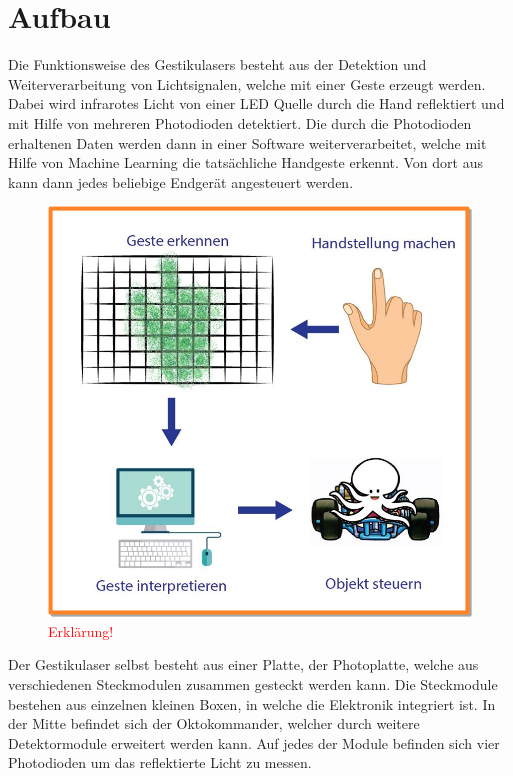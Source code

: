 \chapter{Aufbau}
\label{ch:Funktionsweise und Aufbau}
Die Funktionsweise des Gestikulasers besteht aus der Detektion und Weiterverarbeitung von Lichtsignalen, welche mit einer Geste erzeugt werden. Dabei wird infrarotes Licht von einer LED Quelle durch die Hand reflektiert und mit Hilfe von mehreren Photodioden detektiert. Die durch die Photodioden erhaltenen Daten werden dann in einer Software weiterverarbeitet, welche mit Hilfe von Machine Learning die tatsächliche Handgeste erkennt. Von dort aus kann dann jedes beliebige Endgerät angesteuert werden.

\begin{figure}[h]
	\centering
	\includegraphics[scale=0.8]{../figures/AblaufGestikulaser.png}
	\caption{\textcolor{red}{Erklärung!}}
	\label{fig:AblaufGestikulaser}
\end{figure}

Der Gestikulaser selbst besteht aus einer Platte, der Photoplatte, welche aus verschiedenen Steckmodulen zusammen gesteckt werden kann. Die Steckmodule bestehen aus einzelnen kleinen Boxen, in welche die Elektronik integriert ist. In der Mitte befindet sich der Oktokommander, welcher durch weitere Detektormodule erweitert werden kann. Auf jedes der Module befinden sich vier Photodioden um das reflektierte Licht zu messen. 

